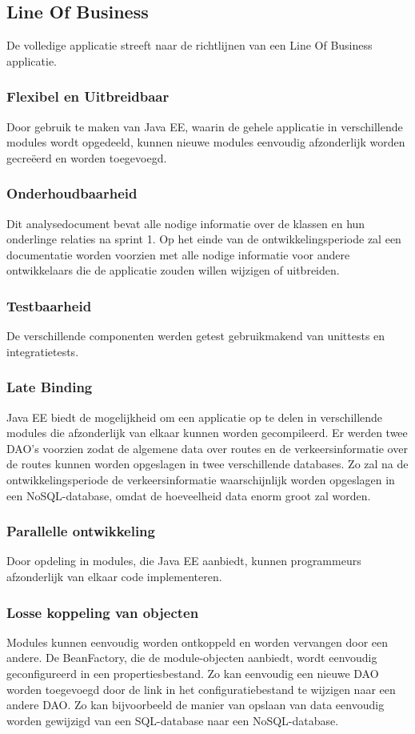 \documentclass[ps,a4paper,oneside]{report}
\begin{document}
\subsection{Line Of Business}
De volledige applicatie streeft naar de richtlijnen van een Line Of Business applicatie. 
\subsubsection{Flexibel en Uitbreidbaar}
Door gebruik te maken van Java EE, waarin de gehele applicatie in verschillende modules wordt opgedeeld, kunnen nieuwe modules eenvoudig afzonderlijk worden gecre\"eerd en worden toegevoegd. 
\subsubsection{Onderhoudbaarheid}
Dit analysedocument bevat alle nodige informatie over de klassen en hun onderlinge relaties na sprint 1. Op het einde van de ontwikkelingsperiode zal een documentatie worden voorzien met alle nodige informatie voor andere ontwikkelaars die de applicatie zouden willen wijzigen of uitbreiden.
\subsubsection{Testbaarheid}
De verschillende componenten werden getest gebruikmakend van unittests en integratietests.
\subsubsection{Late Binding}
Java EE biedt de mogelijkheid om een applicatie op te delen in verschillende modules die afzonderlijk van elkaar kunnen worden gecompileerd. Er werden twee DAO's voorzien zodat de algemene data over routes en de verkeersinformatie over de routes kunnen worden opgeslagen in twee verschillende databases. Zo zal na de ontwikkelingsperiode de verkeersinformatie waarschijnlijk worden opgeslagen in een NoSQL-database, omdat de hoeveelheid data enorm groot zal worden. 
\subsubsection{Parallelle ontwikkeling}
Door opdeling in modules, die Java EE aanbiedt, kunnen programmeurs afzonderlijk van elkaar code implementeren.
\subsubsection{Losse koppeling van objecten}
Modules kunnen eenvoudig worden ontkoppeld en worden vervangen door een andere. De BeanFactory, die de module-objecten aanbiedt, wordt eenvoudig geconfigureerd in een propertiesbestand. Zo kan eenvoudig een nieuwe DAO worden toegevoegd door de link in het configuratiebestand te wijzigen naar een andere DAO. Zo kan bijvoorbeeld de manier van opslaan van data eenvoudig worden gewijzigd van een SQL-database naar een NoSQL-database.
\end{document}
